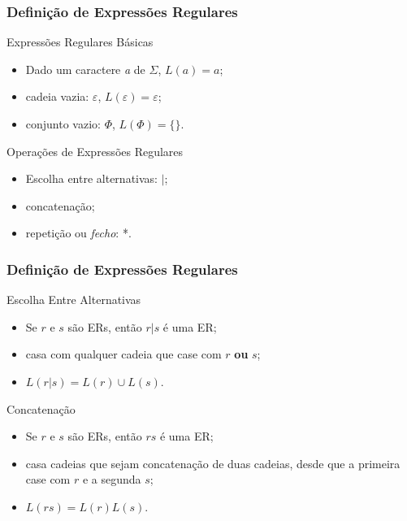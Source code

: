 \documentclass[table]{beamer}
\begin{document}
\begin{frame}
   \frametitle{Definição de Expressões Regulares}
   \begin{block}{Expressões Regulares Básicas}
      \begin{itemize}
         \item Dado um caractere \textit{a} de $\Sigma$, $L(a) = {a}$;
	 \item cadeia vazia: $\varepsilon$, $L(\varepsilon) = {\varepsilon}$;
	 \item conjunto vazio: $\Phi$, $L(\Phi) = \{ \}$. 
      \end{itemize}
   \end{block}
   \begin{block}{Operações de Expressões Regulares}
      \begin{itemize}
         \item Escolha entre alternativas: $|$;
	 \item concatenação;
	 \item repetição ou \textit{fecho}: *.
      \end{itemize}
   \end{block}
\end{frame}

\begin{frame}
   \frametitle{Definição de Expressões Regulares}
   \begin{block}{Escolha Entre Alternativas}
      \begin{itemize}
         \item Se $r$ e $s$ são ERs, então $r|s$ é uma ER;
	 \item casa com qualquer cadeia que case com $r$ \textbf{ou} $s$;
	 \item $L(r|s)=L(r) \cup L(s)$.
      \end{itemize}
   \end{block}
   \begin{block}{Concatenação}
      \begin{itemize}
         \item Se $r$ e $s$ são ERs, então $rs$ é uma ER;
	 \item casa cadeias que sejam concatenação de duas cadeias, desde que a primeira case com  $r$ e a segunda $s$;
	 \item $L(rs)=L(r)L(s)$.
      \end{itemize}
   \end{block}
\end{frame}
\end{document}
